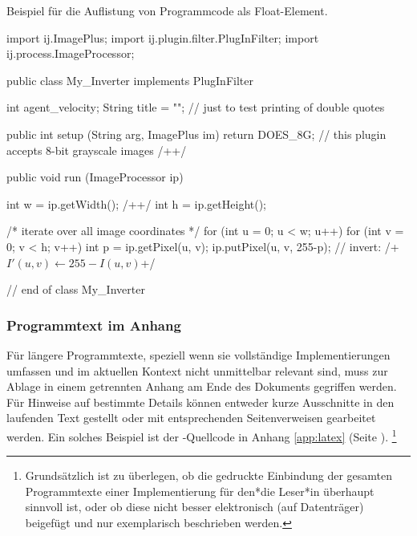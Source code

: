 \begin{program}
\caption{Beispiel für die Auflistung von Programmcode als Float-Element.}
\label{prog:CodeExample}
\begin{JavaCode}
import ij.ImagePlus;
import ij.plugin.filter.PlugInFilter;
import ij.process.ImageProcessor;

public class My_Inverter implements PlugInFilter {
	int agent_velocity;
  String title = ""; // just to test printing of double quotes

	public int setup (String arg, ImagePlus im) {
		return DOES_8G;	// this plugin accepts 8-bit grayscale images /+\label{pr:IjSamplePlugin10}+/
	}

	public void run (ImageProcessor ip) {
		int w = ip.getWidth();	/+\label{ExampleCodeLabel}+/
		int h = ip.getHeight(); 
		
		/* iterate over all image coordinates */
		for (int u = 0; u < w; u++) { 
			for (int v = 0; v < h; v++) {
				int p = ip.getPixel(u, v); 
				ip.putPixel(u, v, 255-p); // invert: /+$I'(u,v) \leftarrow 255 - I(u,v)$\label{MathInCode}+/
			}
		}
	}		
} // end of class My_Inverter
\end{JavaCode}
%
\end{program}


\subsubsection{Programmtext im Anhang}

Für längere Programmtexte, speziell wenn sie vollständige
Implementierungen umfassen und im aktuellen Kontext nicht
unmittelbar relevant sind, muss zur Ablage in einem getrennten
Anhang am Ende des Dokuments gegriffen werden. Für Hinweise auf bestimmte
Details können entweder kurze Ausschnitte in den laufenden Text
gestellt oder mit entsprechenden Seitenverweisen gearbeitet werden. Ein
solches Beispiel ist der \latex-Quellcode in Anhang
\ref{app:latex} (Seite \pageref{app:latex}).%
\footnote{%
Grundsätzlich ist zu überlegen, ob die gedruckte Einbindung der gesamten
Programmtexte einer Implementierung für den*die Leser*in überhaupt sinnvoll ist, oder
ob diese nicht besser elektronisch (auf Datenträger) beigefügt und nur exemplarisch
beschrieben werden.}
